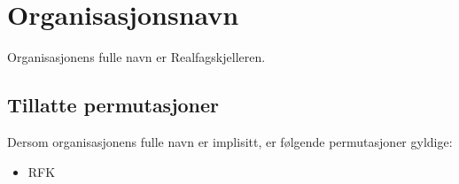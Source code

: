 \section{Organisasjonsnavn} \label{organisasjonsnavn}

Organisasjonens fulle navn er Realfagskjelleren.

\subsection{Tillatte permutasjoner}

Dersom organisasjonens fulle navn er implisitt, er følgende permutasjoner gyldige:

\begin{itemize}
    \item RFK
\end{itemize}
